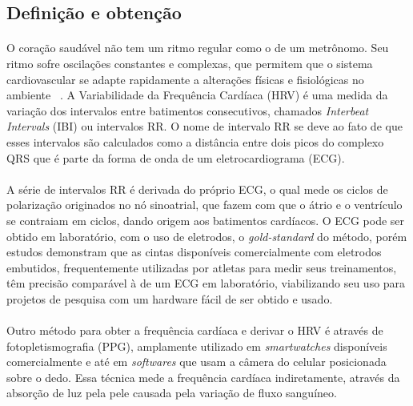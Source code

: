         \subsection {Definição e obtenção}
        \paragraph{} O coração saudável não tem um ritmo regular como o de um metrônomo. Seu ritmo sofre oscilações constantes e complexas, que permitem que o sistema cardiovascular se adapte rapidamente a alterações físicas e fisiológicas no ambiente ~\cite{Hansen2004HeartDetraining}. A Variabilidade da Frequência Cardíaca (HRV) é uma medida da variação dos intervalos entre batimentos consecutivos, chamados \textit{Interbeat Intervals} (IBI) ou intervalos RR. O nome de intervalo RR se deve ao fato de que esses intervalos são calculados como a distância entre dois picos do complexo QRS que é parte da forma de onda de um eletrocardiograma (ECG). ~\cite{TaskForceoftheEuropeanSocietyofCardiologytheNorthAmericanSocietyofPacing1996HeartUse}
        
        \paragraph{} A série de intervalos RR é derivada do próprio ECG, o qual mede os ciclos de polarização originados no nó sinoatrial, que fazem com que o átrio e o ventrículo se contraiam em ciclos, dando origem aos batimentos cardíacos. O ECG pode ser obtido em laboratório, com o uso de eletrodos, o \textit{gold-standard} do método, porém estudos \cite{Plews2017ComparisonMethods, Giles2016ValidityRest.} demonstram que as cintas disponíveis comercialmente com eletrodos embutidos, frequentemente utilizadas por atletas para medir seus treinamentos, têm precisão comparável à de um ECG em laboratório, viabilizando seu uso para projetos de pesquisa com um hardware fácil de ser obtido e usado. 
        
        \paragraph{} Outro método para obter a frequência cardíaca e derivar o HRV é através de fotopletismografia (PPG), amplamente utilizado em \textit{smartwatches} disponíveis comercialmente e até em \textit{softwares} que usam a câmera do celular posicionada sobre o dedo. Essa técnica mede a frequência cardíaca indiretamente, através da absorção de luz pela pele causada pela variação de fluxo sanguíneo. 
       
